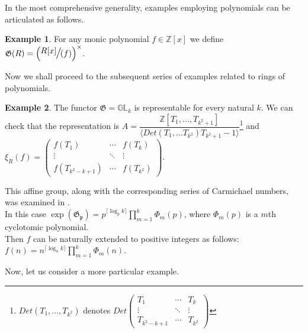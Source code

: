 \documentclass{article}
\theoremstyle{definition}
\newtheorem{example}{Example}
\theoremstyle{definition}
\begin{document}
In the most comprehensive generality, examples employing polynomials can be articulated as follows.
\begin{example} For any monic polynomial $f \in \mathbb{Z}[x]$ we define
    $\mathfrak{G}(R) =\Large{\left( \sfrac{R[x]}{(f)}\right)^{\times}}$.
\end{example}

Now we shall proceed to the subsequent series of examples related to rings of polynomials.
    
\begin{example}
The functor $\mathfrak {G} = \mathbb{GL}_{k}$ is representable for every natural $k.$ We can check that the representation is $A = \dfrac{\mathbb{Z}[T_1, ..., T_{k^2+1}]}{\langle Det(T_1, ... T_{k^2})T_{k^2+1}-1 \rangle}$\footnote{$Det(T_1, ..., T_{k^2})$ denotes $Det\begin{pmatrix}
  T_1 & \cdots & T_k\\
  \vdots & \ddots &  \vdots\\
  T_{k^2-k+1} & \cdots & T_{k^2} 
 \end{pmatrix}$} and $\xi_R(f)=\begin{pmatrix}
  f(T_1) & \cdots & f(T_k)\\
  \vdots & \ddots &  \vdots\\
  f(T_{k^2-k+1}) & \cdots & f(T_{k^2}) 
 \end{pmatrix}$.

This affine group, along with the corresponding series of Carmichael numbers, was examined in \cite{1}.\\

In this case $\operatorname{exp}(\mathfrak{G_p}) = p^{\lceil\log _p k\rceil} \prod_{m=1}^k \Phi_m(p)$, where $\Phi_m(p)$ is a $m$th cyclotomic polynomial.\\

Then $f$ can be naturally extended to positive integers as follows: $f(n) = n^{\lceil\log _n k\rceil} \prod_{m=1}^k \Phi_m(n)$.\\
\end{example}


Now, let us consider a more particular example.
\end{document}
